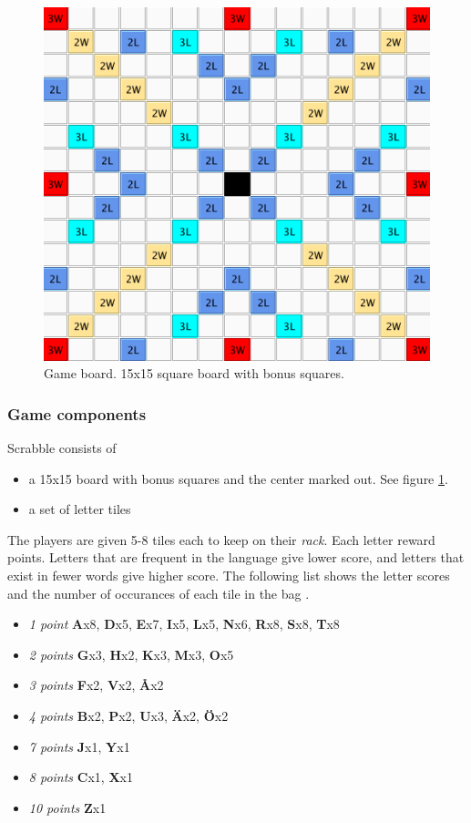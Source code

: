 \documentclass[a4paper, 12pt]{report}
\begin{document}
\begin{figure}[h]
\centering
\includegraphics[scale=0.5]{board}
\caption {Game board. 15x15 square board with bonus squares.}
\label{fig:game-board}
\end{figure}

\subsubsection{Game components}
Scrabble consists of 

\begin{itemize}
\item a 15x15 board with bonus squares and the center marked out. See figure \ref{fig:game-board}.
\item a set of letter tiles
\end{itemize}

The players are given 5-8 tiles each to keep on their \emph{rack}. Each letter reward points. Letters that are frequent in the language give lower score, and letters that exist in fewer words give higher score. The following list shows the letter scores and the number of occurances of each tile in the bag \cite{letterpoints}.

\begin{itemize}
\label{letter+table}
	\item{\emph{1 point}} \textbf{A}x8, \textbf{D}x5, \textbf{E}x7, \textbf{I}x5, \textbf{L}x5, \textbf{N}x6, \textbf{R}x8, \textbf{S}x8, \textbf{T}x8
	\item{\emph{2 points}} \textbf{G}x3, \textbf{H}x2, \textbf{K}x3, \textbf{M}x3, \textbf{O}x5
	\item{\emph{3 points}} \textbf{F}x2, \textbf{V}x2, \textbf{Å}x2
	\item{\emph{4 points}} \textbf{B}x2, \textbf{P}x2, \textbf{U}x3, \textbf{Ä}x2, \textbf{Ö}x2
	\item{\emph{7 points}} \textbf{J}x1, \textbf{Y}x1
	\item{\emph{8 points}} \textbf{C}x1, \textbf{X}x1
	\item{\emph{10 points}} \textbf{Z}x1
\end{itemize}
\end{document}
